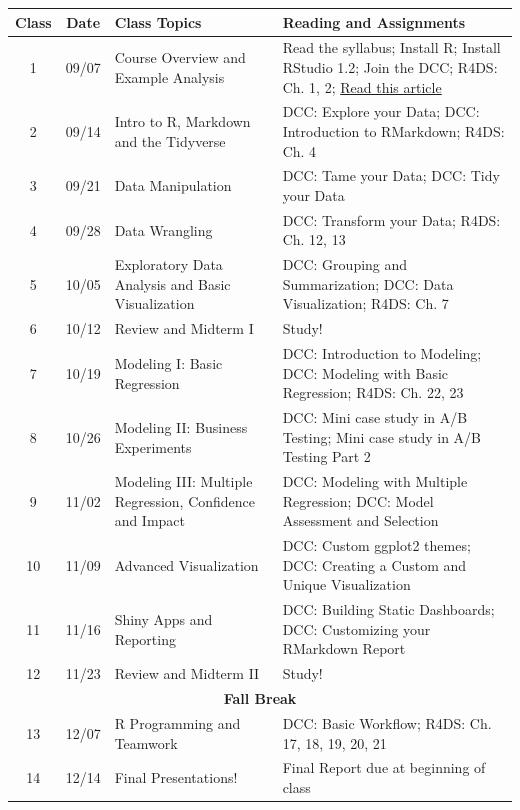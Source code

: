 \documentclass[11pt]{article}
\begin{document}
\def\arraystretch{1.5}%
{\footnotesize
\begin{longtable}{ | c | c | p{5.5cm} | p{7.5cm} |}
\hline
\hline
\textbf{Class} & \textbf{Date} & \textbf{Class Topics} & \textbf{Reading and Assignments} \\
\hline
\hline
1 & 09/07 & Course Overview and Example Analysis  & Read the syllabus; Install R; Install RStudio 1.2; Join the DCC; R4DS: Ch. 1, 2; \href{https://towardsdatascience.com/from-r-vs-python-to-r-and-python-aa25db33ce17}{Read this article} \\
\hline
2 &09/14 &  Intro to R, Markdown and the Tidyverse & DCC: Explore your Data; DCC: Introduction to RMarkdown; R4DS: Ch. 4  \\
\hline
3 &09/21 & Data Manipulation & DCC: Tame your Data; DCC: Tidy your Data  \\
\hline
4 &09/28 &  Data Wrangling & DCC: Transform your Data; R4DS: Ch. 12, 13  \\
\hline
5 & 10/05 & Exploratory Data Analysis and Basic Visualization & DCC: Grouping and Summarization; DCC: Data Visualization; R4DS: Ch. 7 \\
\hline
6 & 10/12 & Review and Midterm I  & Study! \\
\hline
7 & 10/19 & Modeling I: Basic Regression  &  DCC: Introduction to Modeling; DCC: Modeling with Basic Regression; R4DS: Ch. 22, 23\\
\hline
8 & 10/26 & Modeling II: Business Experiments & DCC: Mini case study in A/B Testing; Mini case study in A/B Testing Part 2  \\
\hline
9 & 11/02 & Modeling III: Multiple Regression, Confidence and Impact  & DCC: Modeling with Multiple Regression; DCC: Model Assessment and Selection  \\
\hline
10 & 11/09 & Advanced Visualization  & DCC: Custom ggplot2 themes; DCC: Creating a Custom and Unique Visualization  \\
\hline
11 & 11/16 & Shiny Apps and Reporting & DCC: Building Static Dashboards; DCC: Customizing your RMarkdown Report  \\
\hline
12 & 11/23 & Review and Midterm II  & Study!  \\
\hline
\hline
\multicolumn{4}{c}{\cellcolor{gray!25}\textbf{Fall Break}} \\
\hline
\hline
13 & 12/07 &  R Programming and Teamwork  & DCC: Basic Workflow; R4DS: Ch. 17, 18, 19, 20, 21\\
\hline
14 & 12/14 & Final Presentations!  & Final Report due at beginning of class  \\
\hline
\end{longtable}}
\end{document}
